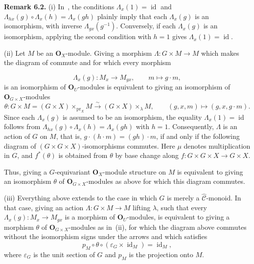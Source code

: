 \medskip
\noindent{}\textbf{Remark 6.2.}
(i) In~, the conditions
\(\Lambda_x(1)=\operatorname{id}\) and
\(\Lambda_{hx}(g)\circ\Lambda_x(h)=\Lambda_x(gh)\) plainly imply that
each \(\Lambda_x(g)\) is an isomorphism, with inverse
\(\Lambda_{gx}(g^{-1})\). Conversely, if each \(\Lambda_x(g)\) is an
isomorphism, applying the second condition with \(h=1\) gives
\(\Lambda_x(1)=\operatorname{id}\).

(ii) Let \(M\) be an \(\mathbf O_X\)-module. Giving a morphism
\(\Lambda:G\times M\to M\) which makes the diagram of 
commute and for which every morphism

\[
  \Lambda_x(g):M_x\longrightarrow M_{gx},
  \qquad m\longmapsto g\cdot m,
\]
is an isomorphism of \(\mathbf O_U\)-modules is equivalent to giving an
isomorphism of \(\mathbf O_{G\times X}\)-modules
\[
  \theta:
  G\times M=(G\times X)\times_{\mathrm{pr}_X}M
  \xrightarrow{\ \sim\ }(G\times X)\times_\lambda M,
  \qquad
  (g,x,m)\longmapsto(g,x,g\cdot m).
\]
Since each \(\Lambda_x(g)\) is assumed to be an isomorphism, the equality
\(\Lambda_x(1)=\operatorname{id}\) follows from
\(\Lambda_{hx}(g)\circ\Lambda_x(h)=\Lambda_x(gh)\) with \(h=1\).
Consequently, \(\Lambda\) is an action of \(G\) on \(M\), that is,
\(g\cdot(h\cdot m)=(gh)\cdot m\), if and only if the following diagram
of \((G\times G\times X)\)-isomorphisms commutes. Here \(\mu\) denotes
multiplication in \(G\), and \(f^*(\theta)\) is obtained from \(\theta\)
by base change along \(f:G\times G\times X\to G\times X\).

\begin{figure}[H]
  \centering
  
  \label{fig:sga3-exp1-p040-equivariance-cocycle}
\end{figure}

Thus, giving a \(G\)-equivariant \(\mathbf O_X\)-module structure on
\(M\) is equivalent to giving an isomorphism \(\theta\) of
\(\mathbf O_{G\times X}\)-modules as above for which this diagram
commutes.

(iii) Everything above extends to the case in which \(G\) is merely a
\(\widehat{\mathscr C}\)-monoid. In that case, giving an action
\(\Lambda:G\times M\to M\) lifting \(\lambda\), such that every
\(\Lambda_x(g):M_x\to M_{gx}\) is a morphism of
\(\mathbf O_U\)-modules, is equivalent to giving a morphism \(\theta\)
of \(\mathbf O_{G\times X}\)-modules as in~(ii), for which the diagram
above commutes without the isomorphism signs under the arrows and which
satisfies
\[
  p_M\circ\theta\circ(\varepsilon_G\times\operatorname{id}_M)
  =\operatorname{id}_M,
\]
where \(\varepsilon_G\) is the unit section of \(G\) and \(p_M\) is the
projection onto \(M\).

